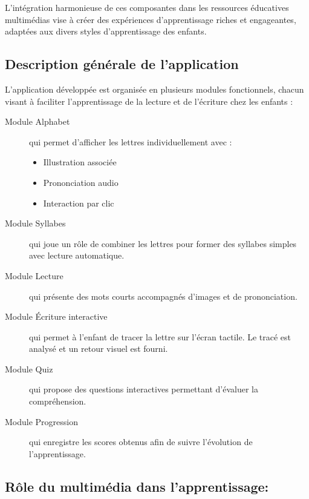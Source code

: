 \documentclass[a4paper,oneside,12pt]{book}
\begin{document}
L'intégration harmonieuse de ces composantes dans les ressources éducatives multimédias vise à créer des expériences d'apprentissage riches et engageantes, adaptées aux divers styles d'apprentissage des enfants.\\

\subsection{Description générale de l'application}
L'application développée est organisée en plusieurs modules fonctionnels, chacun visant à faciliter l'apprentissage de la lecture et de l'écriture chez les enfants :

\begin{description}
	
	\item[Module Alphabet] 
	
	 qui permet d'afficher les lettres individuellement avec :
	\begin{itemize}
		\item Illustration associée
		\item Prononciation audio
		\item Interaction par clic
	\end{itemize}
	
	\item[Module Syllabes] 
	qui joue un rôle de combiner les lettres pour former des syllabes simples avec lecture automatique.
	
	\item[Module Lecture] 
	qui présente des mots courts accompagnés d'images et de prononciation.
	
	\item[Module Écriture interactive] 
	qui permet à l'enfant de tracer la lettre sur l'écran tactile. Le tracé est analysé et un retour visuel est fourni.
	
	\item[Module Quiz] 
	qui propose des questions interactives permettant d'évaluer la compréhension.
	
	\item[Module Progression] 
	qui enregistre les scores obtenus afin de suivre l'évolution de l'apprentissage.
	
\end{description}


\subsection{Rôle du multimédia dans l'apprentissage:}
\end{document}
